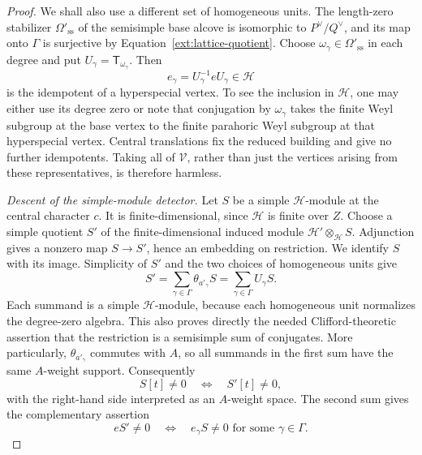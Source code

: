 \begin{proof}
  We shall also use a different set of homogeneous units.  The
  length-zero stabilizer $\Omega'_{\mathrm{ss}}$ of the semisimple base
  alcove is isomorphic to $P^\vee/Q^\vee$, and its map onto $\Gamma$ is
  surjective by Equation~\eqref{ext:lattice-quotient}.  Choose
  $\omega_\gamma\in\Omega'_{\mathrm{ss}}$ in each degree and put
  $U_\gamma=\mathsf T_{\omega_\gamma}$.  Then
  \begin{equation}\label{ext:hyperspecial-conjugates}
    e_\gamma=U_\gamma^{-1}eU_\gamma\in\mathcal H
  \end{equation}
  is the idempotent of a hyperspecial vertex.  To see the inclusion in
  $\mathcal H$, one may either use its degree zero or note that conjugation
  by $\omega_\gamma$ takes the finite Weyl subgroup at the base vertex
  to the finite parahoric Weyl subgroup at that hyperspecial vertex.
  Central translations fix the reduced building and give no further
  idempotents.  Taking all of $\mathcal V$, rather than just the vertices
  arising from these representatives, is therefore harmless.

  \smallskip
  \noindent\emph{Descent of the simple-module detector.}
  Let $S$ be a simple $\mathcal H$-module at the central character $c$.
  It is finite-dimensional, since $\mathcal H$ is finite over $Z$.
  Choose a simple quotient $S'$ of the finite-dimensional induced module
  $\mathcal H'\otimes_{\mathcal H}S$.  Adjunction gives a nonzero map
  $S\to S'$, hence an embedding on restriction.  We identify $S$ with
  its image.  Simplicity of $S'$ and the two choices of homogeneous units
  give
  \begin{equation}\label{ext:clifford-sums}
    S'=\sum_{\gamma\in\Gamma}\theta_{a'_\gamma}S
       =\sum_{\gamma\in\Gamma}U_\gamma S.
  \end{equation}
  Each summand is a simple $\mathcal H$-module, because each homogeneous
  unit normalizes the degree-zero algebra.  This also proves directly
  the needed Clifford-theoretic assertion that the restriction is a
  semisimple sum of conjugates.  More particularly,
  $\theta_{a'_\gamma}$ commutes with $A$, so all summands in the first
  sum have the same $A$-weight support.  Consequently
  \begin{equation}\label{ext:restriction-support}
    S[t]\ne0\quad\Longleftrightarrow\quad S'[t]\ne0,
  \end{equation}
  with the right-hand side interpreted as an $A$-weight space.
  The second sum gives the complementary assertion
  \begin{equation}\label{ext:restriction-spherical}
    eS'\ne0
    \quad\Longleftrightarrow\quad
    e_\gamma S\ne0\text{ for some }\gamma\in\Gamma.
  \end{equation}


\end{proof}
